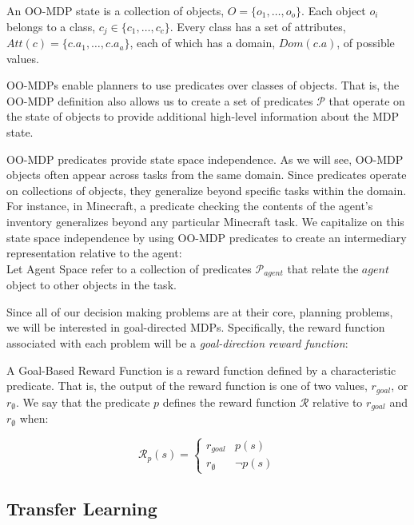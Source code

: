 \documentclass[11pt]{article}
\begin{document}
An OO-MDP state is a collection of objects, $O = \{o_1, \ldots, o_o \}$.  Each object
$o_i$ belongs to a class, $c_j \in \{c_1, \ldots, c_c\}$. Every class
has a set of attributes, $Att(c) = \{c.a_1, \ldots, c.a_a \}$, each of
which has a domain, $Dom(c.a)$, of possible values. 

OO-MDPs enable planners to use predicates over classes of objects. That is, the
OO-MDP definition also allows us to create a set of predicates $\mathcal{P}$ that
operate on the state of objects to provide additional high-level
information about the MDP state.

OO-MDP predicates provide state space independence. As we will see, OO-MDP objects
often appear across tasks from the same domain. Since predicates operate on collections
of objects, they generalize beyond specific tasks within the domain.
For instance, in Minecraft, a predicate checking the contents of the agent's inventory
generalizes beyond any particular Minecraft task. We capitalize on this state space
independence by using OO-MDP predicates to create an intermediary representation relative to the agent: \\

{ Let \textup{Agent Space} refer to a collection of predicates $\mathcal{P}_{agent}$ that relate the $agent$ object to other objects in the task}.


Since all of our decision making problems are at their core, planning problems, we will be interested in goal-directed MDPs. Specifically, the reward function associated with each problem will be a {\it goal-direction reward function}: \\

{ A \textup{Goal-Based Reward Function} is a reward function defined by a characteristic predicate. That is, the output of the reward function is one of two values, $r_{goal}$, or $r_{\emptyset}$. We say that the predicate $p$ defines the reward function $\mathcal{R}$ relative to $r_{goal}$ and $r_\emptyset$ when:

\begin{equation}
\mathcal{R}_p(s) = \begin{cases}
r_{goal}& p(s) \\
r_{\emptyset}&\neg p(s)
\end{cases}
\end{equation}}

\subsection{Transfer Learning}
\end{document}
